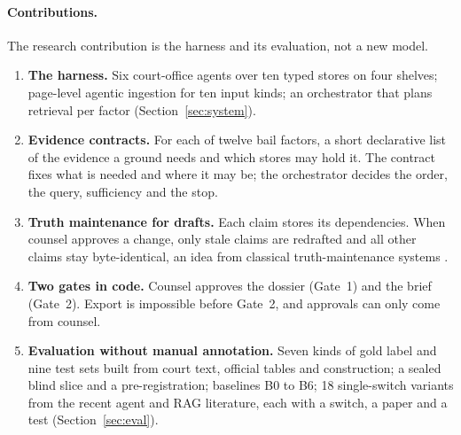 \paragraph{Contributions.} The research contribution is the harness and its evaluation, not a new model.
\begin{enumerate}\setlength\itemsep{0pt}
\item \textbf{The harness.} Six court-office agents over ten typed stores on four shelves; page-level agentic ingestion for ten input kinds; an orchestrator that plans retrieval per factor (Section~\ref{sec:system}).
\item \textbf{Evidence contracts.} For each of twelve bail factors, a short declarative list of the evidence a ground needs and which stores may hold it. The contract fixes what is needed and where it may be; the orchestrator decides the order, the query, sufficiency and the stop.
\item \textbf{Truth maintenance for drafts.} Each claim stores its dependencies. When counsel approves a change, only stale claims are redrafted and all other claims stay byte-identical, an idea from classical truth-maintenance systems \citep{doyle1979tms}.
\item \textbf{Two gates in code.} Counsel approves the dossier (Gate~1) and the brief (Gate~2). Export is impossible before Gate~2, and approvals can only come from counsel.
\item \textbf{Evaluation without manual annotation.} Seven kinds of gold label and nine test sets built from court text, official tables and construction; a sealed blind slice and a pre-registration; baselines B0 to B6; 18 single-switch variants from the recent agent and RAG literature, each with a switch, a paper and a test (Section~\ref{sec:eval}).
\end{enumerate}

